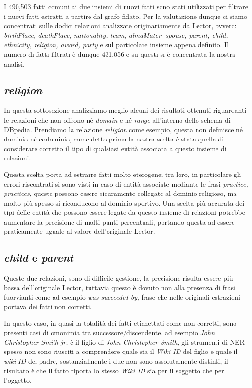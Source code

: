 \documentclass[10pt,a4paper,twocolumn]{article}
\begin{document}
I 490,503 fatti comuni ai due insiemi di nuovi fatti sono stati utilizzati per filtrare i nuovi fatti estratti a partire dal grafo fidato. Per la valutazione dunque ci siamo concentrati sulle dodici relazioni analizzate originariamente da Lector, ovvero:
\textit{birthPlace, deathPlace, nationality, team, almaMater, spouse, parent, child, ethnicity, religion, award, party} e sul particolare insieme appena definito. Il numero di fatti filtrati è dunque 431,056 e su questi si è concentrata la nostra analisi.

\subsection{\textit{religion}}

In questa sottosezione analizziamo meglio alcuni dei risultati ottenuti riguardanti le relazioni che non offrono né \textit{domain} e né \textit{range} all'interno dello schema di DBpedia. Prendiamo la relazione \textit{religion} come esempio, questa non definisce né dominio né codominio, come detto prima la nostra scelta è stata quella di considerare corretto il tipo di qualsiasi entità associata a questo insieme di relazioni.

Questa scelta porta ad estrarre fatti molto eterogenei tra loro, in particolare gli errori riscontrati si sono visti in caso di entità associate mediante le frasi \textit{practice, practices}, queste possono essere sicuramente collegate al dominio religioso, ma molto più spesso si riconducono al dominio sportivo. Una scelta più accurata dei tipi delle entità che possono essere legate da questo insieme di relazioni potrebbe aumentare la precisione di molti punti percentuali, portando questa ad essere praticamente uguale al valore dell'originale Lector.

\subsection{\textit{child} e \textit{parent}}\label{child&parent}

Queste due relazioni, sono di difficile gestione, la precisione risulta essere più bassa dell'originale Lector, tuttavia questo è dovuto non alla presenza di frasi fuorvianti come ad esempio \textit{was succeeded by}, frase che nelle originali estrazioni portava dei fatti non corretti. 

In questo caso, in quasi la totalità dei fatti etichettati come non corretti, sono presenti casi di omonimia tra successore/discendente, ad esempio \textit{John Christopher Smith jr.} è il figlio di \textit{John Christopher Smith}, gli strumenti di NER spesso non sono riusciti a comprendere quale sia il \textit{Wiki ID} del figlio e quale il \textit{wiki ID} del padre, sostanzialmente i due non sono assolutamente distinti, il risultato è che il fatto riporta lo stesso \textit{Wiki ID} sia per il soggetto che per l'oggetto.
\end{document}
